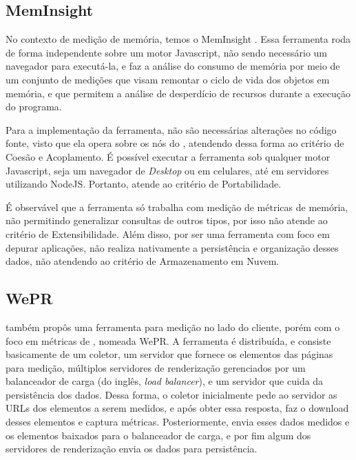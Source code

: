 \documentclass[12pt]{tcc}
\begin{document}
		\subsection{MemInsight}
		\label{subsection:meminsight}

		No contexto de medição de memória, temos o MemInsight \citep{Jensen2015MemInsight}. Essa ferramenta roda de forma independente sobre um motor Javascript, não sendo necessário um navegador para executá-la, e faz a análise do consumo de memória por meio de um conjunto de medições que visam remontar o ciclo de vida dos objetos em memória, e que permitem a análise de desperdício de recursos durante a execução do programa. 

		Para a implementação da ferramenta, não são necessárias alterações no código fonte, visto que ela opera sobre os nós do , atendendo dessa forma ao critério de Coesão e Acoplamento. É possível executar a ferramenta sob qualquer motor Javascript, seja um navegador de \emph{Desktop} ou em celulares, até em servidores utilizando NodeJS. Portanto, atende ao critério de Portabilidade.


		É observável que a ferramenta só trabalha com medição de métricas de memória, não permitindo generalizar consultas de outros tipos, por isso não atende ao critério de Extensibilidade. Além disso, por ser uma ferramenta com foco em depurar aplicações, não realiza nativamente a persistência e organização desses dados, não atendendo ao critério de Armazenamento em Nuvem.		

		\subsection{WePR}
		\label{WePR}
		\par \citet{Asrese2019MeasuringWL} também propôs uma ferramenta para medição no lado do cliente, porém com o foco em métricas de , nomeada WePR. A ferramenta é distribuída, e consiste basicamente de um coletor, um servidor que fornece os elementos das páginas para medição, múltiplos servidores de renderização gerenciados por um balanceador de carga (do inglês, \emph{load balancer}), e um servidor que cuida da persistência dos dados. Dessa forma, o coletor inicialmente pede ao servidor as URLs dos elementos a serem medidos, e após obter essa resposta, faz o download desses elementos e captura métricas. Posteriormente, envia esses dados medidos e os elementos baixados para o balanceador de carga, e por fim algum dos servidores de renderização envia os dados para persistência. 
\end{document}
